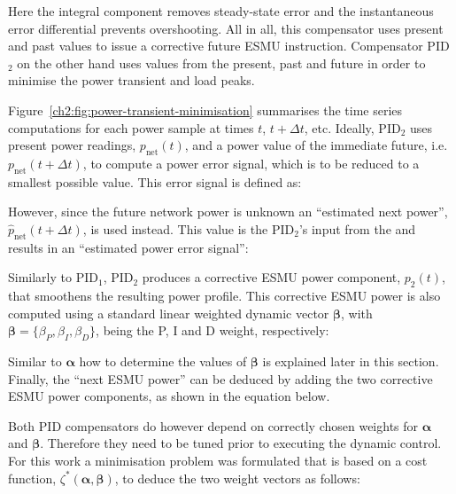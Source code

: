 

Here the integral component removes steady-state error and the instantaneous error differential prevents overshooting.
All in all, this compensator uses present and past values to issue a corrective future ESMU instruction.
Compensator PID$_2$ on the other hand uses values from the present, past and future in order to minimise the power transient and load peaks.



Figure~\ref{ch2:fig:power-transient-minimisation} summarises the time series computations for each power sample at times $t$, $t+\Delta t$, etc.
Ideally, PID$_2$ uses present power readings, $p_\text{net}(t)$, and a power value of the immediate future, i.e. $p_\text{net}(t+\Delta t)$, to compute a power error signal, which is to be reduced to a smallest possible value.
This error signal is defined as:



However, since the future network power is unknown an ``estimated next power'', $\hat{p}_\text{net}(t+\Delta t)$, is used instead.
This value is the PID$_2$'s input from the  and results in an ``estimated power error signal'':



Similarly to PID$_1$, PID$_2$ produces a corrective ESMU power component, $p_2(t)$, that smoothens the resulting power profile.
This corrective ESMU power is also computed using a standard linear weighted dynamic vector $\boldsymbol{\beta}$, with $\boldsymbol{\beta} = \{\beta_P, \beta_I, \beta_D\}$, being the P, I and D weight, respectively:



Similar to $\boldsymbol{\alpha}$ how to determine the values of $\boldsymbol{\beta}$ is explained later in this section.
Finally, the ``next ESMU power'' can be deduced by adding the two corrective ESMU power components, as shown in the equation below.



Both PID compensators do however depend on correctly chosen weights for $\boldsymbol{\alpha}$ and $\boldsymbol{\beta}$.
Therefore they need to be tuned prior to executing the dynamic control.
For this work a minimisation problem was formulated that is based on a cost function, $\zeta^*(\boldsymbol{\alpha}, \boldsymbol{\beta})$, to deduce the two weight vectors as follows:


